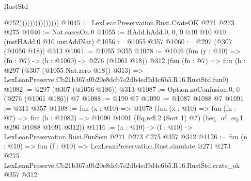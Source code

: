 \begin{lexlean}{RustStd}
\begin{coremodule}
                                  @752)))))))))))))))
@1045 := LexLeanPreservation.Rust.CrateOK @271 @273 @275
@1046 := Nat.casesOn.{0}
@1055 := HAdd.hAdd.{0, 0, 0} @10 @10 @10 (instHAdd.{0} @10 instAddNat)
@1056 := @1055 @357
@1060 := @297 (@307 (@1056 @18)) @313
@1061 := @1055 @355
@1078 := @1046
    (fun (y : @10) => (fn : @7) -> (h : @1060) -> @276 (@1061 @18))
    @312
    (fun (fn : @7) =>
    fun (h : @297 (@307 (@1055 Nat.zero @18)) @313) =>
    LexLeanPreserve.Cb21b367a0b20e8dcb7e2db4ed9d4c6b5.R16.RustStd.fun0)
@1082 := @297 (@307 (@1056 @186)) @313
@1087 := Option.noConfusion.{0, 0} (@276 (@1061 @186)) @7
@1088 := @190 @7
@1090 := @1087 @1088 @7
@1091 := @311 @357
@1108 := fun (x : @10) =>
  @1078
    (fun (x : @10) =>
    fun (fn : @7) =>
    fun (h : @1082) => @1090 @1091 (Eq.refl.{2} (Sort 1) @7) (heq_of_eq.{1} @296 @1088 @1091 @312))
@1116 := (n : @10) -> (f : @10) -> LexLeanPreservation.Rust.FunSem @271 @273 @275 @357 @312
@1126 := fun (n : @10) =>
  fun (f : @10) =>
  LexLeanPreservation.Rust.simulate
    @271
    @273
    @275
    LexLeanPreserve.Cb21b367a0b20e8dcb7e2db4ed9d4c6b5.R16.RustStd.crate_ok
    @357
    @312
\end{coremodule}
\end{lexlean}
